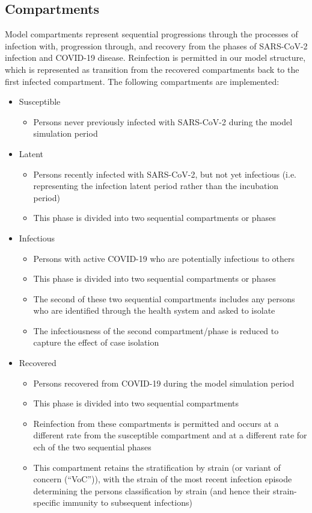 \subsection{Compartments}
Model compartments represent sequential progressions through the processes of 
infection with, progression through, and recovery from the phases of SARS-CoV-2
infection and COVID-19 disease.
Reinfection is permitted in our model structure, 
which is represented as transition from the recovered compartments 
back to the first infected compartment.
The following compartments are implemented:
\begin{itemize}
    \item Susceptible
    \begin{itemize}
        \item Persons never previously infected with SARS-CoV-2 during the model simulation period
    \end{itemize}
    \item Latent
    \begin{itemize}
        \item Persons recently infected with SARS-CoV-2, but not yet infectious 
        (i.e. representing the infection latent period rather than the incubation period)
        \item This phase is divided into two sequential compartments or phases
    \end{itemize}
    \item Infectious
    \begin{itemize}
        \item Persons with active COVID-19 who are potentially infectious to others
        \item This phase is divided into two sequential compartments or phases
        \item The second of these two sequential compartments 
        includes any persons who are identified through the health system and asked to isolate
        \item The infectiousness of the second compartment/phase 
        is reduced to capture the effect of case isolation
    \end{itemize}
    \item Recovered
    \begin{itemize}
        \item Persons recovered from COVID-19 during the model simulation period
        \item This phase is divided into two sequential compartments
        \item Reinfection from these compartments is permitted 
        and occurs at a different rate from the susceptible compartment 
        and at a different rate for ech of the two sequential phases
        \item This compartment retains the stratification by strain 
        (or variant of concern (``VoC'')), 
        with the strain of the most recent infection episode
        determining the persons classification by strain
        (and hence their strain-specific immunity to subsequent infections)
    \end{itemize}
\end{itemize}
